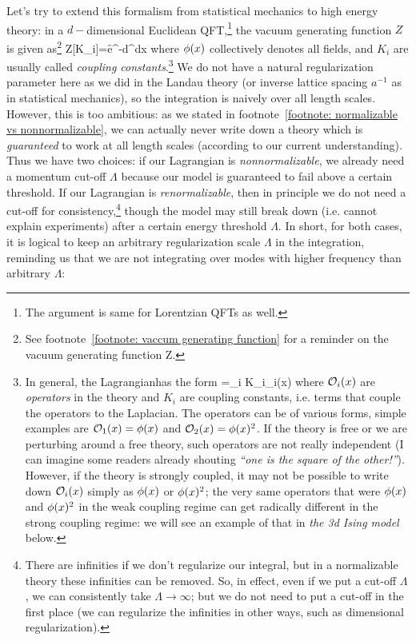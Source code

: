 \documentclass[12pt]{article}
\numberwithin{equation}{section}
\begin{document}
Let's try to extend this formalism from statistical mechanics to high energy theory: in a $d-$dimensional Euclidean QFT,\footnote{The argument is same for Lorentzian QFTs as well.} the vacuum generating function $Z$ is given as\footnote{See footnote~\ref{footnote: vaccum generating function} for a reminder on the vacuum generating function Z.} 
\be 
Z[K_i]=\int \cD \f e^{-\int d^dx\cL[K_i,\f(x)]}
\ee 
where $\phi(x)$ collectively denotes all fields, and $K_i$ are usually called \emph{coupling constants}.\footnote{In general, the Lagrangian\footnotemark has the form
\be 
\label{eq: most general form of Lagrangian}
\cL[K_i,\f(x)]=\sum_i K_i\cO_i(x)
\ee 
where $\mathcal{O}_i(x)$ are \emph{operators} in the theory and $K_i$ are coupling constants, i.e. terms that couple the operators to the Laplacian. The operators can be of various forms, simple examples are $\mathcal{O}_1(x)=\phi(x)$ and $\mathcal{O}_2(x)=\phi(x)^2$. If the theory is free or we are perturbing around a free theory, such operators are not really independent (I can imagine some readers already shouting \emph{``one is the square of the other!''}). However, if the theory is strongly coupled, it may not be possible to write down $\mathcal{O}_i(x)$ simply as $\phi(x)$ or $\phi(x)^2$; the very same operators that were $\phi(x)$ and $\phi(x)^2$ in the weak coupling regime can get radically different in the strong coupling regime: we will see an example of that in \emph{the 3d Ising model} below.
} We do not have a natural regularization parameter here as we did in the Landau theory (or inverse lattice spacing $a^{-1}$ as in statistical mechanics), so the integration is naively over all length scales. However, this is too ambitious: as we stated in footnote~\ref{footnote: normalizable vs nonnormalizable}, we can actually never write down a theory which is \emph{guaranteed} to work at all length scales (according to our current understanding). Thus we have two choices: if our Lagrangian is \emph{nonnormalizable}, we already need a momentum cut-off $\Lambda$ because our model is guaranteed to fail above a certain threshold. If our Lagrangian is \emph{renormalizable}, then in principle we do not need a cut-off for consistency,\footnote{There are infinities if we don't regularize our integral, but in a normalizable theory these infinities can be removed. So, in effect, even if we put a cut-off $\Lambda$, we can consistently take $\Lambda\rightarrow\infty$; but we do not need to put a cut-off in the first place (we can regularize the infinities in other ways, such as dimensional regularization).} though the model may still break down (i.e. cannot explain experiments) after a certain energy threshold $\Lambda$. In short, for both cases, it is logical to keep an arbitrary regularization scale $\Lambda$ in the integration, reminding us that we are not integrating over modes  with higher frequency than arbitrary $\Lambda$:
\end{document}
